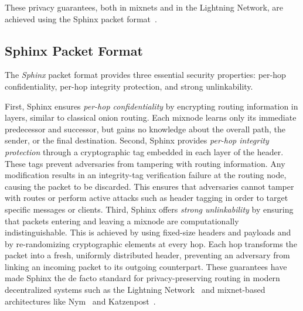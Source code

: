 These privacy guarantees, both in mixnets and in the Lightning Network, are achieved using the Sphinx packet format~\cite{sphinx}.

\subsection{Sphinx Packet Format}
The \emph{Sphinx} packet format provides three essential security properties: per-hop confidentiality, per-hop integrity protection, and strong unlinkability.

First, Sphinx ensures \emph{per-hop confidentiality} by encrypting routing information in layers, similar to classical onion routing.  
Each mixnode learns only its immediate predecessor and successor, but gains no knowledge about the overall path, the sender, or the final destination. Second, Sphinx provides \emph{per-hop integrity protection} through a cryptographic tag embedded in each layer of the header. These tags prevent adversaries from tampering with routing information.  Any modification results in an integrity-tag verification failure at the routing node, causing the packet to be discarded.
This ensures that adversaries cannot tamper with routes or perform active attacks such as header tagging in order to target specific messages or clients. Third, Sphinx offers \emph{strong unlinkability} by ensuring that packets entering and leaving a mixnode are computationally indistinguishable.  
This is achieved by using fixed-size headers and payloads and by re-randomizing cryptographic elements at every hop.
Each hop transforms the packet into a fresh, uniformly distributed header, preventing an adversary from linking an incoming packet to its outgoing counterpart. These guarantees have made Sphinx the de facto standard for privacy-preserving routing in modern decentralized systems such as the Lightning Network~\cite{poon2016bitcoin} and mixnet-based architectures like Nym~\cite{nym} and Katzenpost~\cite{infeld2025echomix}.

